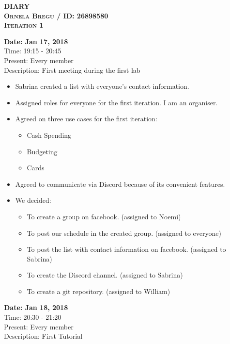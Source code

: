 \documentclass[12pt]{article}
\begin{document}
\begin{center}
    
\textbf{\textsc{DIARY}} \\
\textbf{\textsc{Ornela Bregu / ID: 26898580}} \\ 
\textbf{\textsc{Iteration 1}}
\end{center}

\begin{flushleft}    

\textbf{Date: Jan 17, 2018} \\
Time: 19:15 - 20:45 \\
Present: Every member \\
Description: First meeting during the first lab   \\

\begin{itemize}
  \item Sabrina created a list with everyone’s contact information.
  \item Assigned roles for everyone for the first iteration. I am an organiser.
  \item Agreed on three use cases for the first iteration:
  \begin{itemize}
  \item Cash Spending 
  \item Budgeting 
  \item Cards
  \end{itemize}
  \item Agreed to communicate via Discord because of its convenient features.


  \item We decided: 
\begin{itemize}
  \item To create a group on facebook. (assigned to Noemi)
  \item To post our schedule in the created group. (assigned to everyone)
  \item To post the list with contact information on facebook. (assigned to Sabrina)
  \item To create the Discord channel. (assigned to Sabrina)
  \item To create a git repository. (assigned to William)
  \end{itemize}
 \end{itemize}
   

\textbf{Date: Jan 18, 2018} \\
Time: 20:30 - 21:20 \\
Present: Every member \\
Description: First Tutorial  \\


\end{flushleft}
\end{document}
